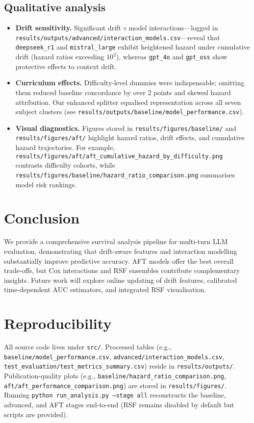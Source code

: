 ﻿\documentclass{article}
\begin{document}
\subsection{Qualitative analysis}
\begin{itemize}
    \item \textbf{Drift sensitivity.} Significant drift\,$\times$\,model interactions---logged in \texttt{results/outputs/advanced/interaction\_models.csv}---reveal that \texttt{deepseek\_r1} and \texttt{mistral\_large} exhibit heightened hazard under cumulative drift (hazard ratios exceeding $10^2$), whereas \texttt{gpt\_4o} and \texttt{gpt\_oss} show protective effects to context drift.
    \item \textbf{Curriculum effects.} Difficulty-level dummies were indispensable; omitting them reduced baseline concordance by over 2 points and skewed hazard attribution. Our enhanced splitter equalised representation across all seven subject clusters (see \texttt{results/outputs/baseline/model\_performance.csv}).
    \item \textbf{Visual diagnostics.} Figures stored in \texttt{results/figures/baseline/} and \texttt{results/figures/aft/} highlight hazard ratios, drift effects, and cumulative hazard trajectories. For example, \texttt{results/figures/aft/aft\_cumulative\_hazard\_by\_difficulty.png} contrasts difficulty cohorts, while \texttt{results/figures/baseline/hazard\_ratio\_comparison.png} summarises model risk rankings.
\end{itemize}

\section{Conclusion}
We provide a comprehensive survival analysis pipeline for multi-turn LLM evaluation, demonstrating that drift-aware features and interaction modelling substantially improve predictive accuracy. AFT models offer the best overall trade-offs, but Cox interactions and RSF ensembles contribute complementary insights. Future work will explore online updating of drift features, calibrated time-dependent AUC estimators, and integrated RSF visualisation.

\section*{Reproducibility}
All source code lives under \texttt{src/}. Processed tables (e.g., \texttt{baseline/model\_performance.csv}, \texttt{advanced/interaction\_models.csv}, \texttt{test\_evaluation/test\_metrics\_summary.csv}) reside in \texttt{results/outputs/}. Publication-quality plots (e.g., \texttt{baseline/hazard\_ratio\_comparison.png}, \texttt{aft/aft\_performance\_comparison.png}) are stored in \texttt{results/figures/}. Running \texttt{python run\_analysis.py --stage all} reconstructs the baseline, advanced, and AFT stages end-to-end (RSF remains disabled by default but scripts are provided).



\end{document}
